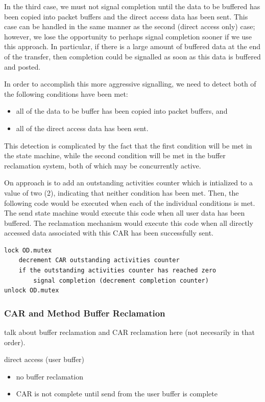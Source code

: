 \documentclass[11pt,letterpaper]{article}
\begin{document}
In the third case, we must not signal completion until the data to be buffered
has been copied into packet buffers and the direct access data has been sent.
This case can be handled in the same manner as the second (direct access only)
case; however, we lose the opportunity to perhaps signal completion sooner if
we use this approach.  In particular, if there is a large amount of buffered
data at the end of the transfer, then completion could be signalled as soon as
this data is buffered and posted.

In order to accomplish this more aggressive signalling, we need to detect both
of the following conditions have been met:
\begin{itemize}
\item all of the data to be buffer has been copied into packet buffers, and
\item all of the direct access data has been sent.
\end{itemize}
This detection is complicated by the fact that the first condition will be met
in the state machine, while the second condition will be met in the buffer
reclamation system, both of which may be concurrently active.

On approach is to add an outstanding activities counter which is intialized to
a value of two (2), indicating that neither condition has been met.  Then, the
following code would be executed when each of the individual conditions is met.
The send state machine would execute this code when all user data has been
buffered.  The reclamation mechanism would execute this code when all directly
accessed data associated with this CAR has been successfully sent.
\begin{verbatim}
lock OD.mutex
    decrement CAR outstanding activities counter
    if the outstanding activities counter has reached zero
        signal completion (decrement completion counter)
unlock OD.mutex
\end{verbatim}

%
%
\subsubsection{CAR and Method Buffer Reclamation}

talk about buffer reclamation and CAR reclamation here (not necesarily in that
order).

direct access (user buffer)
\begin{itemize}
\item no buffer reclamation
\item CAR is not complete until send from the user buffer is complete
\end{itemize}
\end{document}
